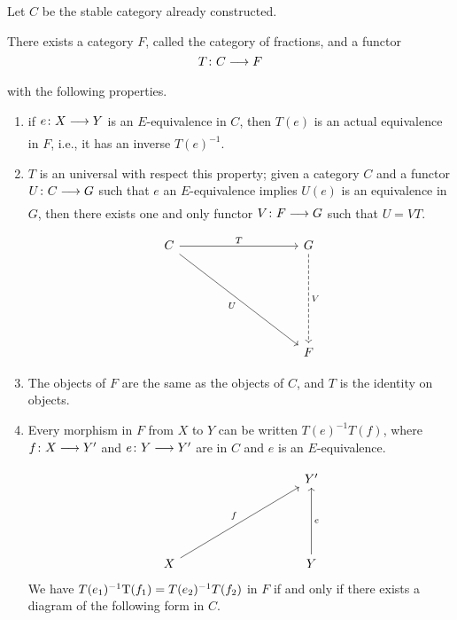 \documentclass[../main]{subfiles}
\begin{document}
Let $C$ be the stable category already constructed.
\begin{theorem} \label{thm:p3ch14.1}
There exists a category $F$, called the category of fractions, and a functor
\[
  T\colon C \lar{} F 
\] with the following properties.

\begin{enumerate}[label=(\roman*)]
  \item if $e\colon X \lar{} Y $ is an $E$-equivalence in $C$, then  $T (e)$ is an actual equivalence in $F$, i.e., it has an inverse  $T (e)^{-1}$.
  \item  $T$ is an universal with respect this property; given a category $C$ and a functor $U\colon C \lar{} G$ such that $e$ an $E$-equivalence implies  $U(e)$ is an equivalence in $G$, then there exists one and only functor  $V\colon F \lar{} G  $ such that $U = VT$. 
\[\begin{tikzcd}
	C &&&& G \\
	\\
	\\
	\\
	&&&& F
	\arrow["T", from=1-1, to=1-5]
	\arrow["U"', from=1-1, to=5-5]
	\arrow["V", dashed, from=1-5, to=5-5]
\end{tikzcd}\]
\item The objects of $F$ are the same as the objects of $C$, and  $T$ is the identity on objects.
\item Every morphism in $F$ from $X$ to  $Y$ can be written  $T (e)^{-1}T (f)$, where $f\colon X \lar{} Y'  $ and $e\colon Y \lar{} Y'  $ are in $C$ and  $e$ is an $E$-equivalence. \\
  \[\begin{tikzcd}
	&&&& {Y'} \\
	\\
	\\
	X &&&& Y
	\arrow["f", from=4-1, to=1-5]
	\arrow["e"', from=4-5, to=1-5]
\end{tikzcd}\]
We have $T (e_1)^{-1}\mathrm{T }(f_1)=T (e_2)^{-1}T (f_2)$ in $F$ if and only if there exists a diagram of the following form in $C$. 


\end{enumerate}
\end{theorem}
\end{document}
